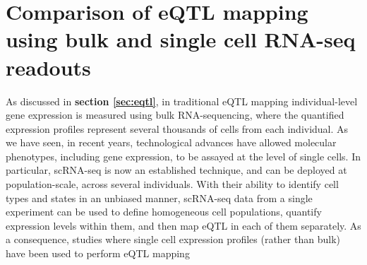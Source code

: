 
\chapter{Comparison of eQTL mapping using bulk and single cell RNA-seq readouts}
\label{chapter3}

As discussed in \textbf{section 
\ref{sec:eqtl}},
in traditional 
eQTL
mapping 
individual-level 
gene expression 
is
measured using bulk RNA-sequencing, where 
the quantified 
expression profiles represent
several thousands of cells from each individual.
As we have seen, in recent years, technological advances 
have allowed molecular phenotypes, including gene expression, to be assayed at the level of single cells.
In particular, 
scRNA-seq
is now an established technique, 
and can be deployed at population-scale, across several individuals.
With their ability to identify cell types and states in an unbiased manner,
scRNA-seq
data from a single experiment can be used to define homogeneous cell populations, quantify expression levels within them, and then map eQTL in each of them separately.
As a consequence, studies where single cell expression profiles (rather than bulk) have been used to perform
eQTL
mapping 
